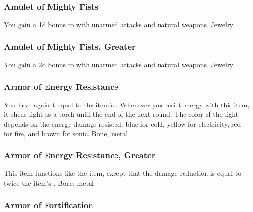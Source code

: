 \lowercase{\hypertarget{item:Amulet of Mighty Fists}{}}\label{item:Amulet of Mighty Fists}
\hypertarget{item:Amulet of Mighty Fists}{\subsubsection{Amulet of Mighty Fists\hfill{}}}
You gain a \plus1d bonus to  with unarmed attacks and natural weapons.
 
 Jewelry
\lowercase{\hypertarget{item:Amulet of Mighty Fists, Greater}{}}\label{item:Amulet of Mighty Fists, Greater}
\hypertarget{item:Amulet of Mighty Fists, Greater}{\subsubsection{Amulet of Mighty Fists, Greater\hfill{}}}
You gain a \plus2d bonus to  with unarmed attacks and natural weapons.
 
 Jewelry
\lowercase{\hypertarget{item:Armor of Energy Resistance}{}}\label{item:Armor of Energy Resistance}
\hypertarget{item:Armor of Energy Resistance}{\subsubsection{Armor of Energy Resistance\hfill{}}}
You have  against  equal to the item's .
Whenever you resist energy with this item, it sheds light as a torch until the end of the next round.
The color of the light depends on the energy damage resisted: blue for cold, yellow for electricity, red for fire, and brown for sonic.
 
 Bone, metal
\lowercase{\hypertarget{item:Armor of Energy Resistance, Greater}{}}\label{item:Armor of Energy Resistance, Greater}
\hypertarget{item:Armor of Energy Resistance, Greater}{\subsubsection{Armor of Energy Resistance, Greater\hfill{}}}
This item functions like the  item, except that the damage reduction is equal to twice the item's .
 
 Bone, metal
\lowercase{\hypertarget{item:Armor of Fortification}{}}\label{item:Armor of Fortification}
\hypertarget{item:Armor of Fortification}{\subsubsection{Armor of Fortification\hfill{}}}
